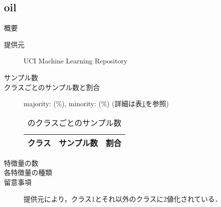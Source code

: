 \subsection{oil}
\begin{description}
    \item[概要] \cite{}
    \item[提供元] UCI Machine Learning Repository
    \item[サンプル数] 
    \item[クラスごとのサンプル数と割合] majority:  (\%), minority:  (\%) (詳細は表\ref{tab:}を参照)

        \begin{table}
            \centering
            \caption{のクラスごとのサンプル数}
            \label{tab:}
            \begin{tabular}{lrc} \hline
                \multicolumn{1}{c}{クラス}&
                \multicolumn{1}{c}{サンプル数}&
                \multicolumn{1}{c}{割合}\\
                \hline
                \hline

                \hline
            \end{tabular}
        \end{table}

    \item[特徴量の数] 
    \item[各特徴量の種類] \mbox{}
        
    \item[留意事項] 提供元により，クラス1とそれ以外のクラスに2値化されている．
\end{description}

